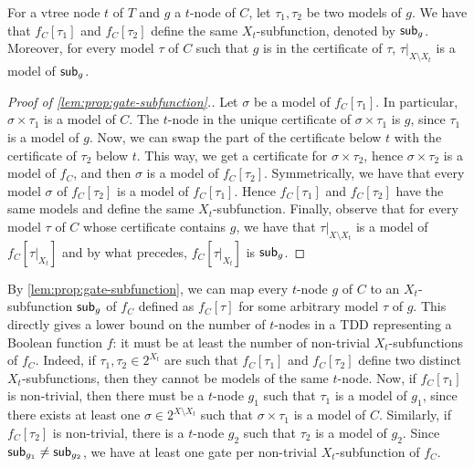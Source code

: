 \documentclass[a4paper,UKenglish,cleveref, autoref, thm-restate]{lipics-v2021}
\begin{document}
\begin{lemma}[$\star$]
  \label{lem:prop:gate-subfunction}
For a vtree node $t$ of $T$ and $g$ a $t$-node of $C$, let $\tau_1,\tau_2$ be two models of $g$. We have that $f_C[\tau_1]$ and $f_C[\tau_2]$ define the same $X_t$-subfunction, denoted by $\mathsf{sub}_g$. Moreover, for every model $\tau$ of $C$ such that $g$ is in the certificate of $\tau$, $\tau|_{X \setminus X_t}$ is a model of $\mathsf{sub}_g$.
\end{lemma}
\begin{toappendix}
\begin{proof}[Proof of \cref{lem:prop:gate-subfunction}.]
Let $\sigma$ be a model of $f_C[\tau_1]$. In particular, $\sigma \times \tau_1$ is a model of $C$. The $t$-node in the unique certificate of $\sigma \times \tau_1$ is $g$, since $\tau_1$ is a model of $g$. Now, we can swap the part of the certificate below $t$ with the certificate of $\tau_2$ below $t$. This way, we get a certificate for $\sigma \times \tau_2$, hence $\sigma \times \tau_2$ is a model of $f_C$, and then $\sigma$ is a model of $f_C[\tau_2]$. Symmetrically, we have that every model $\sigma$ of $f_C[\tau_2]$ is a model of $f_C[\tau_1]$. Hence $f_C[\tau_1]$ and $f_C[\tau_2]$ have the same models and define the same $X_t$-subfunction.  Finally, observe that for every model $\tau$ of $C$ whose certificate contains $g$, we have that $\tau|_{X \setminus X_t}$ is a model of $f_C[\tau|_{X_t}]$ and by what precedes, $f_C[\tau|_{X_t}]$ is $\mathsf{sub}_g$. 
\end{proof}
\end{toappendix}

By \cref{lem:prop:gate-subfunction}, we can map  every $t$-node $g$ of $C$ to an $X_t$-subfunction $\mathsf{sub}_g$ of $f_C$ defined as $f_C[\tau]$ for some arbitrary model $\tau$ of $g$. This directly gives a lower bound on the number of $t$-nodes in a TDD  representing a Boolean function $f$: it must be at least the number of non-trivial $X_t$-subfunctions of $f_C$. Indeed, if $\tau_1,\tau_2 \in 2^{X_t}$ are such that $f_C[\tau_1]$ and $f_C[\tau_2]$ define two distinct $X_t$-subfunctions, then they cannot be models of the same $t$-node. Now, if  $f_C[\tau_1]$ is non-trivial, then there must be a $t$-node $g_1$ such that $\tau_1$ is a model of $g_1$, since there exists at least one $\sigma \in 2^{X \setminus X_t}$ such that $\sigma \times \tau_1$ is a model of $C$. Similarly, if $f_C[\tau_2]$ is non-trivial, there is a $t$-node $g_2$ such that $\tau_2$ is a model of $g_2$. Since $\mathsf{sub}_{g_1} \neq \mathsf{sub}_{g_2}$, we have at least one gate per non-trivial $X_t$-subfunction of $f_C$.
\end{document}
